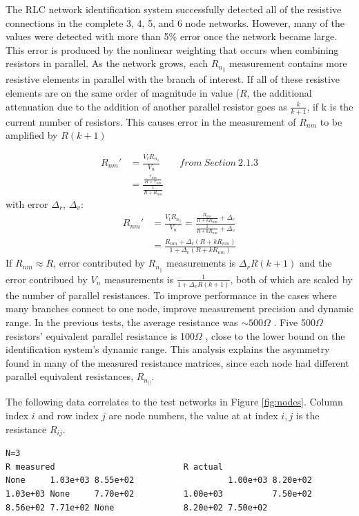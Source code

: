 \documentclass[11pt,twoside]{mitthesis}
\newcommand{\ohm}{$\Omega$ }
\begin{document}
The RLC network identification system successfully detected all of the resistive connections in the complete 3, 4, 5, and 6 node networks.
However, many of the values were detected with more than 5\% error once the network became large.
This error is produced by the nonlinear weighting that occurs when combining resistors in parallel.
As the network grows, each $R_{n_{||}}$ measurement contains more resistive elements in parallel with the branch of interest.
If all of these resistive elements are on the same order of magnitude in value ($R$, the additional attenuation due to the addition of another parallel resistor goes as $\frac{k}{k+1}$, if k is the current number of resistors.
This causes error in the measurement of $R_{nm}$ to be amplified by $R(k+1)$

\begin{align*}
R_{nm}'&= \frac{V_t R_{n_{||}}}{V_n} \qquad from ~ Section ~ 2.1.3\\
&= \frac{\frac{r_{nm}}{R+r_{nm}}}{\frac{1}{R+R_{nm}}}
\end{align*}
with error $\Delta_r$, $\Delta_v$:
\begin{align*}
R_{nm}' &= \frac{V_t R_{n_{||}}}{V_n} = \frac{\frac{R_{nm}}{R+k R_{nm}}+\Delta_r}{\frac{1}{R+kR_{nm}}+\Delta_v}\\
&= \frac{R_{nm}+\Delta_r (R + k R_{nm})}{1+\Delta_v(R+kR_{nm})}
\end{align*}
If $R_{nm}\approx R$, error contributed by $R_{n_{||}}$ measurements is $\Delta_r R (k+1)$ and the error contribued by $V_n$ measurements is $\frac{1}{1+\Delta_v R (k+1)}$, both of which are scaled by the number of parallel resistances.
To improve performance in the cases where many branches connect to one node, improve measurement precision and dynamic range.
In the previous tests, the average resistance was $\sim500$\ohm.
Five 500\ohm resistors' equivalent parallel resistance is 100\ohm, close to the lower bound on the identification system's dynamic range.
This analysis explains the asymmetry found in many of the measured resistance matrices, since each node had different parallel equivalent resistances, $R_{n_{||}}$.

The following data correlates to the test networks in Figure \ref{fig:nodes}.
Column index $i$ and row index $j$ are node numbers, the value at at index $i,j$ is the resistance $R_{ij}$.

\begin{Verbatim}[fontsize=\footnotesize]
N=3
R measured                          R actual
None     1.03e+03 8.55e+02                   1.00e+03 8.20e+02
1.03e+03 None     7.70e+02          1.00e+03          7.50e+02	
8.56e+02 7.71e+02 None              8.20e+02 7.50e+02     
\end{Verbatim}
\end{document}
